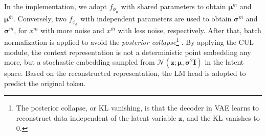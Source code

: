 \documentclass[11pt]{article}
\begin{document}
In the implementation, we adopt $f_{\phi_{\mu}}$ with shared parameters to obtain $\boldsymbol{\mu}^m$ and $\boldsymbol{\mu}^{\bar{m}}$.
Conversely, two $f_{\phi_{\sigma}}$ with independent parameters are used to obtain 
$\boldsymbol{\sigma}^m$ and $\boldsymbol{\sigma}^{\bar{m}}$, for $x^{m}$ with more noise and $x^{\bar{m}}$ with less noise, respectively.
After that, batch normalization \cite{DBLP:conf/icml/IoffeS15} is applied to avoid the \textit{posterior collapse}\footnote{The posterior collapse, or KL vanishing, is that the decoder in VAE learns to reconstruct data independent of the latent variable $\mathbf{z}$, and the KL vanishes to $0$.} \cite{DBLP:conf/acl/ZhuBLMLW20}.
By applying the CUL module, the context representation is not a deterministic point embedding any more, but a stochastic embedding sampled from $\mathcal{N}(\mathbf{z}; \boldsymbol{\mu}, {\boldsymbol{\sigma}}^2 \mathbf{I})$ in the latent space.
Based on the reconstructed representation, the LM head is adopted to predict the original token.
\end{document}
